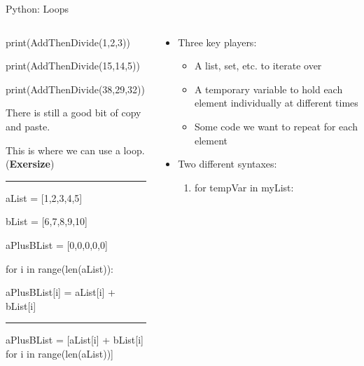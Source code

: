 \documentclass[10pt, aspectratio=169]{beamer}
\begin{document}
\begin{frame}{Python: Loops}
    \begin{columns}
        \begin{column}{0.5\textwidth}
            print(AddThenDivide(1,2,3))

            print(AddThenDivide(15,14,5))
            
            print(AddThenDivide(38,29,32))

            \vspace{0.25cm}

            There is still a good bit of copy and paste.

            This is where we can use a loop. (\textbf{Exersize})

            \hrule

            \vspace{0.5cm}

            aList = [1,2,3,4,5]

            bList = [6,7,8,9,10]

            \vspace{0.25cm}

            aPlusBList = [0,0,0,0,0]

            for i in range(len(aList)):

                \hspace{0.25cm} aPlusBList[i] = aList[i] + bList[i]

            \hrule
            \vspace{0.5cm}
            aPlusBList = [aList[i] + bList[i]  for i in range(len(aList))]


        \end{column}
        \begin{column}{0.5\textwidth}
            \begin{itemize}
                \item Three key players:
                \begin{itemize}
                    \item A list, set, etc. to iterate over
                    \item A temporary variable to hold each element individually at different times
                    \item Some code we want to repeat for each element
                \end{itemize}
                \item Two different syntaxes:
                \begin{enumerate}
                    \item for tempVar in myList:


\end{enumerate}
\end{itemize}
\end{column}
\end{columns}
\end{frame}
\end{document}
